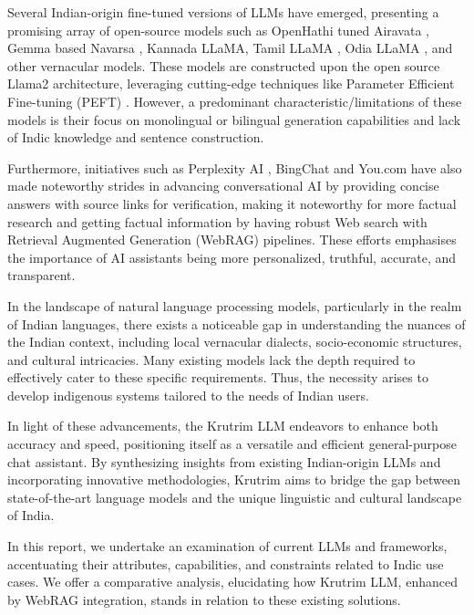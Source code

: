 Several Indian-origin fine-tuned versions of LLMs have emerged, presenting a promising array of open-source models such as OpenHathi tuned Airavata \cite{gala2024airavata}, Gemma based Navarsa \cite{NavarasaTeluguLLMLabs}, Kannada LLaMA, Tamil LLaMA \cite{balachandran2023tamilllama}, Odia LLaMA \cite{kohli2023building}, and other vernacular models. These models are constructed upon the open source Llama2 architecture, leveraging cutting-edge techniques like Parameter Efficient Fine-tuning (PEFT) \cite{houlsby2019parameter,hu2021lora}. However, a predominant characteristic/limitations of these models is their focus on monolingual or bilingual generation capabilities and lack of Indic knowledge and sentence construction.

Furthermore, initiatives such as Perplexity AI \cite{perplexity}, BingChat \cite{bing} and You.com \cite{you} have also made noteworthy strides in advancing conversational AI by providing concise answers with source links for verification, making it noteworthy for more factual research and getting factual information by having robust Web search with Retrieval Augmented Generation (WebRAG) pipelines. These efforts emphasises the importance of AI assistants being more personalized, truthful, accurate, and transparent.

In the landscape of natural language processing models, particularly in the realm of Indian languages, there exists a noticeable gap in understanding the nuances of the Indian context, including local vernacular dialects, socio-economic structures, and cultural intricacies. Many existing models lack the depth required to effectively cater to these specific requirements. Thus, the necessity arises to develop indigenous systems tailored to the needs of Indian users.

In light of these advancements, the Krutrim LLM endeavors to enhance both accuracy and speed, positioning itself as a versatile and efficient general-purpose chat assistant. By synthesizing insights from existing Indian-origin LLMs and incorporating innovative methodologies, Krutrim aims to bridge the gap between state-of-the-art language models and the unique linguistic and cultural landscape of India.

In this report, we undertake an examination of current LLMs and frameworks, accentuating their attributes, capabilities, and constraints related to Indic use cases. We offer a comparative analysis, elucidating how Krutrim LLM, enhanced by WebRAG integration, stands in relation to these existing solutions.


